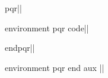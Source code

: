 \documentclass{article}
\begin{document}
\def\printDef#1{\par\expandafter\meaning\csname#1\endcsname||}

\ttfamily
\printDef{pqr}
\printDef{environment pqr code}

\printDef{endpqr}
\printDef{environment pqr end aux }
\end{document}
